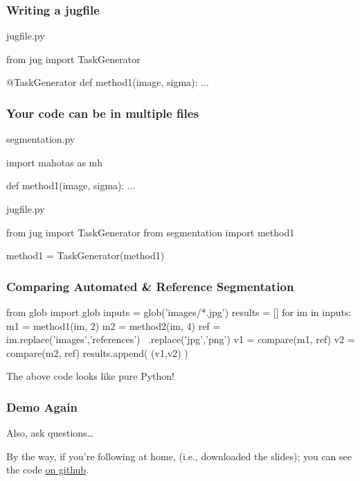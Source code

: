 \documentclass{beamer}
\begin{document}
\begin{frame}[fragile]
\frametitle{Writing a jugfile}

\begin{block}{jugfile.py}
\begin{python}
from jug import TaskGenerator

@TaskGenerator
def method1(image, sigma):
    ...
\end{python}
\end{block}

\end{frame}


\begin{frame}[fragile]
\frametitle{Your code can be in multiple files}


\begin{block}{segmentation.py}
\begin{python}
import mahotas as mh

def method1(image, sigma):
    ...

\end{python}

\end{block}

\begin{block}{jugfile.py}
\begin{python}
from jug import TaskGenerator
from segmentation import method1

method1 = TaskGenerator(method1)

\end{python}
\end{block}
\end{frame}

\begin{frame}[fragile]
\frametitle{Comparing Automated \& Reference Segmentation}

\begin{python}
from glob import glob
inputs = glob('images/*.jpg')
results = []
for im in inputs:
    m1 = method1(im, 2)
    m2 = method2(im, 4)
    ref = im.replace('images','references') \
            .replace('jpg','png')
    v1 = compare(m1, ref)
    v2 = compare(m2, ref)
    results.append( (v1,v2) )
\end{python}

The above code looks like pure Python!
\end{frame}


\begin{frame}[fragile]
\frametitle{Demo Again}

Also, ask questions\ldots

By the way, if you're following at home, (i.e., downloaded the slides); you can
see the code
\href{https://github.com/luispedro/jug-presentations/tree/master/jug-segmentation-tutorial}{on
github}.

\end{frame}
\end{document}
